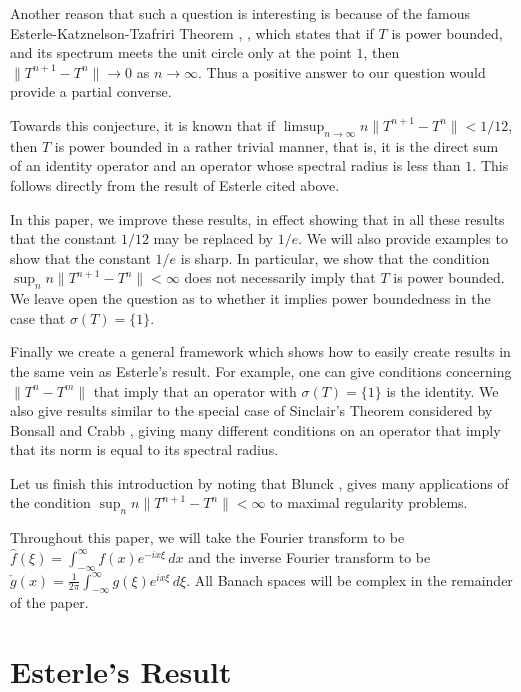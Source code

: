 \documentclass[12pt]{amsart}
\newcommand{\snormo}[1]{{\mathopen\|#1\mathclose\|}}
\begin{document}
Another reason that such a question is
interesting is because of the famous Esterle-Katznelson-Tzafriri Theorem
\cite{esterle}, \cite{Ka}, which states that if $T$ is power bounded,
and its spectrum meets the unit circle only at the point $1$, then
$\snormo{T^{n+1}-T^n} \to 0$ as $n \to \infty$.  Thus a positive answer
to our question would provide a partial converse.

Towards this conjecture,
it is known that if $\limsup_{n\to\infty}n\snormo{T^{n+1}-T^n} < 1/12$,
then $T$ is power bounded in a rather trivial manner, that is, it is the
direct sum of an identity operator
and an operator whose spectral radius is less than $1$.
This follows
directly from the result of Esterle cited above.

In this paper, we improve these results, in effect showing that in all these
results that the constant $1/12$ may be replaced by $1/e$.
We will also provide
examples to show that the constant $1/e$ is sharp.
In particular, we show that the
condition $\sup_n n\snormo{T^{n+1}-T^n} < \infty$ does not necessarily imply
that $T$ is power bounded.
We leave open the question as to whether it
implies power boundedness in the case that $\sigma(T) = \{1\}$.

Finally we create a general framework which shows how to
easily create results in the same vein as Esterle's result.
For example, one can give conditions concerning $\snormo{T^n-T^m}$
that imply that an operator with $\sigma(T)=\{1\}$ is the identity.
We also give results similar to the special case of Sinclair's
Theorem \cite{sinclair} considered by Bonsall and Crabb \cite{bonsall-crabb},
giving many different
conditions on an operator that imply that its norm is equal
to its spectral radius.

Let us finish this introduction by noting that Blunck \cite{blunck1},
\cite{blunck2} gives
many applications of
the condition $\sup_n n \snormo{T^{n+1}-T^n} < \infty$
to maximal regularity problems.

Throughout this paper, we will
take the Fourier transform to be
$\hat f(\xi) = \int_{-\infty}^\infty f(x) e^{-i x \xi} \, dx$
and the inverse Fourier transform to be
$\check g(x) = \frac1{2\pi} \int_{-\infty}^\infty g(\xi) e^{i x \xi} \, d\xi$.
All Banach spaces will be complex in the remainder of the paper.

\section{Esterle's Result}
\end{document}
